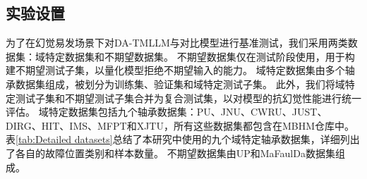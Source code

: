 \documentclass[UTF8,lettersize,journal]{IEEEtran}
\begin{document}
\subsection{实验设置}
为了在幻觉易发场景下对DA-TMLLM与对比模型进行基准测试，我们采用两类数据集：域特定数据集和不期望数据集。
不期望数据集仅在测试阶段使用，用于构建不期望测试子集，以量化模型拒绝不期望输入的能力。
域特定数据集由多个轴承数据集组成，被划分为训练集、验证集和域特定测试子集。
此外，我们将域特定测试子集和不期望测试子集合并为复合测试集，以对模型的抗幻觉性能进行统一评估。
域特定数据集包括九个轴承数据集：PU\cite{PU}、JNU\cite{s130608013}、CWRU\cite{15467457}、JUST\cite{JUST}、DIRG\cite{DAGA2019252}、HIT\cite{HIT}、IMS\cite{IMS}、MFPT\cite{MFPT}和XJTU\cite{XJTU}，所有这些数据集都包含在MBHM仓库\cite{Peng_Liu_Du_Gao_Wang_2025}中。
表\ref{tab:Detailed datasets}总结了本研究中使用的九个域特定轴承数据集，详细列出了各自的故障位置类别和样本数量。
不期望数据集由UP\cite{UP_dataset}和MaFaulDa\cite{MaFaulDa_dataset}数据集组成。
\end{document}
